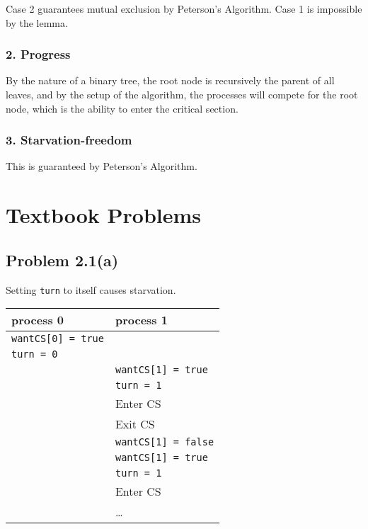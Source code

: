 \documentclass[11pt]{article}
\begin{document}
Case 2 guarantees mutual exclusion by Peterson's Algorithm. Case 1 is impossible
by the lemma.
\subsubsection{2. Progress}
\label{sec:orgda254c0}
By the nature of a binary tree, the root node is recursively the parent of all
leaves, and by the setup of the algorithm, the processes will compete for the
root node, which is the ability to enter the critical section.
\subsubsection{3. Starvation-freedom}
\label{sec:orgeb41952}
This is guaranteed by Peterson's Algorithm.
\section{Textbook Problems}
\label{sec:org15cb0f4}
\subsection{Problem 2.1(a)}
\label{sec:org09587cb}
Setting \texttt{turn} to itself causes starvation.
\begin{center}
\begin{tabular}{ll}
\hline
process 0 & process 1\\
\hline
\texttt{wantCS[0] = true} & \\
\texttt{turn = 0} & \\
 & \texttt{wantCS[1] = true}\\
 & \texttt{turn = 1}\\
 & Enter CS\\
 & Exit CS\\
 & \texttt{wantCS[1] = false}\\
 & \texttt{wantCS[1] = true}\\
 & \texttt{turn = 1}\\
 & Enter CS\\
 & \ldots{}\\
\hline
\end{tabular}
\end{center}
\end{document}
